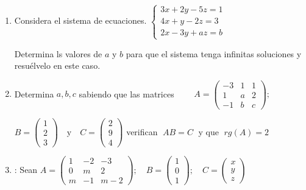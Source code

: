 \begin{enumerate}


\item Considera el sistema de ecuaciones. $\begin{cases} 3x+2y-5z=1\\4x+y-2z=3\\2x-3y+az=b \end{cases} $

Determina ls valores de $a$ y $b$ para que el sistema tenga infinitas soluciones y resuélvelo en este caso.


\item Determina $a,b,c$ sabiendo que las matrices $\qquad A=\left( \begin{matrix}  -3&1&1\\1&a&2\\-1&b&c\end{matrix} \right);$
 
$ B=\left( \begin{matrix}  1\\2\\3\end{matrix} \right)\quad \text{y} \quad C=\left( \begin{matrix}  2\\9\\4\end{matrix} \right)   $  verifican $\;AB=C\; $ y que $\;rg(A)=2$


\item: Sean $A=\left( \begin{matrix} 1&-2&-3\\0&m&2\\m&-1&m-2 \end{matrix} \right); \quad B=\left( \begin{matrix} 1\\0\\1 \end{matrix} \right); \quad C=\left( \begin{matrix} x\\y\\z  \end{matrix} \right)$


\end{enumerate}
